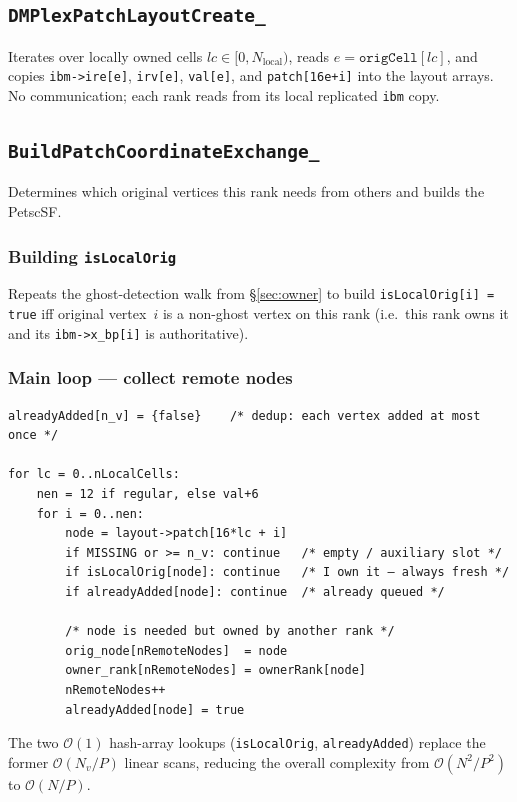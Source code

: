 \documentclass[11pt]{article}
\begin{document}
\subsection{\texttt{DMPlexPatchLayoutCreate\_}}

Iterates over locally owned cells $lc \in [0, N_\text{local})$, reads
$e = \texttt{origCell}[lc]$, and copies \texttt{ibm->ire[e]}, \texttt{irv[e]},
\texttt{val[e]}, and \texttt{patch[16e+i]} into the layout arrays.
No communication; each rank reads from its local replicated \texttt{ibm} copy.

\subsection{\texttt{BuildPatchCoordinateExchange\_}}
\label{sec:exchange}

Determines which original vertices this rank needs from others and builds
the PetscSF.

\subsubsection{Building \texttt{isLocalOrig}}

Repeats the ghost-detection walk from \S\ref{sec:owner} to build
\texttt{isLocalOrig[i] = true} iff original vertex~$i$ is a non-ghost vertex on
this rank (i.e.\ this rank owns it and its \texttt{ibm->x\_bp[i]} is authoritative).

\subsubsection{Main loop --- collect remote nodes}

\begin{lstlisting}
alreadyAdded[n_v] = {false}    /* dedup: each vertex added at most once */

for lc = 0..nLocalCells:
    nen = 12 if regular, else val+6
    for i = 0..nen:
        node = layout->patch[16*lc + i]
        if MISSING or >= n_v: continue   /* empty / auxiliary slot */
        if isLocalOrig[node]: continue   /* I own it — always fresh */
        if alreadyAdded[node]: continue  /* already queued */

        /* node is needed but owned by another rank */
        orig_node[nRemoteNodes]  = node
        owner_rank[nRemoteNodes] = ownerRank[node]
        nRemoteNodes++
        alreadyAdded[node] = true
\end{lstlisting}

The two $\mathcal{O}(1)$ hash-array lookups (\texttt{isLocalOrig},
\texttt{alreadyAdded}) replace the former $\mathcal{O}(N_v/P)$ linear scans,
reducing the overall complexity from $\mathcal{O}(N^2/P^2)$ to $\mathcal{O}(N/P)$.
\end{document}
